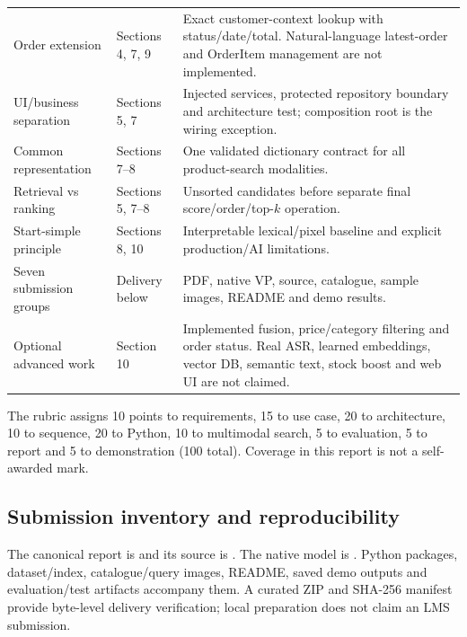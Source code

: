 \documentclass[11pt,a4paper]{article}
\begin{document}
\begin{longtable}{@{}P{3.15cm}P{3.1cm}P{9.15cm}@{}}
Order extension&Sections 4, 7, 9&Exact customer-context lookup with status/date/total. Natural-language latest-order and OrderItem management are not implemented.\\
UI/business separation&Sections 5, 7&Injected services, protected repository boundary and architecture test; composition root is the wiring exception.\\
Common representation&Sections 7--8&One validated dictionary contract for all product-search modalities.\\
Retrieval vs ranking&Sections 5, 7--8&Unsorted candidates before separate final score/order/top-$k$ operation.\\
Start-simple principle&Sections 8, 10&Interpretable lexical/pixel baseline and explicit production/AI limitations.\\
Seven submission groups&Delivery below&PDF, native VP, source, catalogue, sample images, README and demo results.\\
Optional advanced work&Section 10&Implemented fusion, price/category filtering and order status. Real ASR, learned embeddings, vector DB, semantic text, stock boost and web UI are not claimed.\\\bottomrule
\end{longtable}
The rubric assigns 10 points to requirements, 15 to use case, 20 to architecture, 10 to sequence, 20 to Python, 10 to multimodal search, 5 to evaluation, 5 to report and 5 to demonstration (100 total). Coverage in this report is not a self-awarded mark.

\subsection{Submission inventory and reproducibility}
The canonical report is  and its source is . The native model is . Python packages, dataset/index, catalogue/query images, README, saved demo outputs and evaluation/test artifacts accompany them. A curated ZIP and SHA-256 manifest provide byte-level delivery verification; local preparation does not claim an LMS submission.
\end{document}
